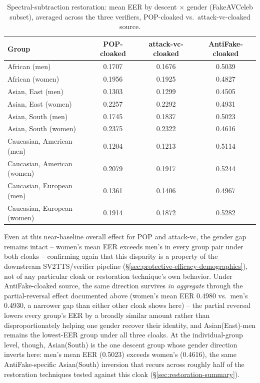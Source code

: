 \documentclass[11pt]{article}
\begin{document}
\begin{table}[H]
\centering
\caption{Spectral-subtraction restoration: mean EER by descent
$\times$ gender (FakeAVCeleb subset), averaged across the three
verifiers, POP-cloaked vs.\ attack-vc-cloaked source.}
\label{tab:restoration-spectral-demographics}
\begin{tabular}{lccc}
\toprule
Group & POP-cloaked & attack-vc-cloaked & AntiFake-cloaked \\
\midrule
African (men)               & 0.1707 & 0.1676 & 0.5039 \\
African (women)              & 0.1956 & 0.1925 & 0.4827 \\
Asian, East (men)            & 0.1303 & 0.1299 & 0.4505 \\
Asian, East (women)          & 0.2257 & 0.2292 & 0.4931 \\
Asian, South (men)           & 0.1745 & 0.1837 & 0.5023 \\
Asian, South (women)         & 0.2375 & 0.2322 & 0.4616 \\
Caucasian, American (men)    & 0.1204 & 0.1213 & 0.5114 \\
Caucasian, American (women)  & 0.2079 & 0.1917 & 0.5244 \\
Caucasian, European (men)    & 0.1361 & 0.1406 & 0.4967 \\
Caucasian, European (women)  & 0.1914 & 0.1872 & 0.5282 \\
\bottomrule
\end{tabular}
\end{table}

Even at this near-baseline overall effect for POP and attack-vc, the
gender gap remains intact -- women's mean EER exceeds men's in every
group pair under both cloaks -- confirming again that this disparity is
a property of the downstream SV2TTS/verifier pipeline
(\S\ref{sec:protective-efficacy-demographics}), not of any particular
cloak or restoration technique's own behavior. Under AntiFake-cloaked
source, the same direction survives \emph{in aggregate} through the
partial-reversal effect documented above (women's mean EER 0.4980 vs.\
men's 0.4930, a narrower gap than either other cloak shows here) -- the
partial reversal lowers every group's EER by a broadly similar amount
rather than disproportionately helping one gender recover their
identity, and Asian(East)-men remains the lowest-EER group under all
three cloaks. At the individual-group level, though, Asian(South) is
the one descent group whose gender direction inverts here: men's mean
EER (0.5023) exceeds women's (0.4616), the same AntiFake-specific
Asian(South) inversion that recurs across roughly half of the
restoration techniques tested against this cloak
(\S\ref{sec:restoration-summary}).
\end{document}
